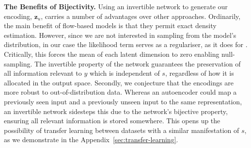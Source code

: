 


\textbf{The Benefits of Bijectivity.}
Using an invertible network to generate our encoding, $\bm{z}_u$, carries a number of advantages over other approaches.
Ordinarily, the main benefit of flow-based models is that they permit exact density estimation. 
However, since we are not interested in sampling from the model's distribution, in our case the likelihood term serves as a regulariser, as it does for  \cite{JacSmeOya18}. 
Critically, this forces the mean of each latent dimension to zero enabling null-sampling. 
The invertible property of the network guarantees the preservation of all information relevant to $y$ which is independent of $s$, regardless of how it is allocated in the output space.
Secondly, we conjecture that the encodings are more robust to out-of-distribution data.
Whereas an autoencoder could map a previously seen input and a previously unseen input to the same representation,
an invertible network sidesteps this due to the network's bijective property, ensuring all relevant information is stored somewhere. This opens up the possibility of transfer learning between datasets with a similar manifestation of $s$, as we demonstrate in the Appendix~\ref{sec:transfer-learning}.

